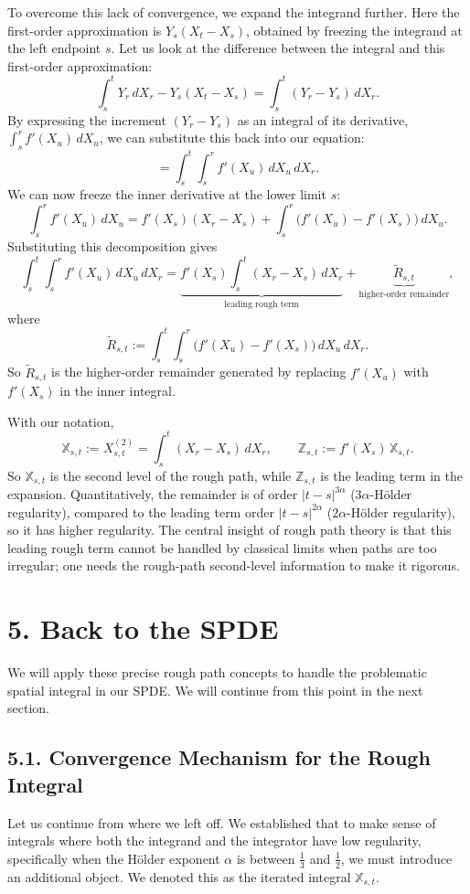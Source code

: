 \documentclass[11pt]{article}
\theoremstyle{definition}
\theoremstyle{remark}
\begin{document}
To overcome this lack of convergence, we expand the integrand further. Here the first-order approximation is $Y_s(X_t-X_s)$, obtained by freezing the integrand at the left endpoint $s$. Let us look at the difference between the integral and this first-order approximation:
\[
\int_s^t Y_r\,dX_r-Y_s(X_t-X_s)=\int_s^t (Y_r-Y_s)\,dX_r.
\]
By expressing the increment $(Y_r-Y_s)$ as an integral of its derivative, $\int_s^r f'(X_u)\,dX_u$, we can substitute this back into our equation:
\[
=\int_s^t\int_s^r f'(X_u)\,dX_u\,dX_r.
\]
We can now freeze the inner derivative at the lower limit $s$:
\[
\int_s^r f'(X_u)\,dX_u
=
f'(X_s)(X_r-X_s)+\int_s^r\bigl(f'(X_u)-f'(X_s)\bigr)\,dX_u.
\]
Substituting this decomposition gives
\[
\int_s^t\int_s^r f'(X_u)\,dX_u\,dX_r
=
\underbrace{f'(X_s)\int_s^t (X_r-X_s)\,dX_r}_{\text{leading rough term}}
+\underbrace{\widetilde R_{s,t}}_{\text{higher-order remainder}},
\]
where
\[
\widetilde R_{s,t}
:=
\int_s^t\int_s^r\bigl(f'(X_u)-f'(X_s)\bigr)\,dX_u\,dX_r.
\]
So $\widetilde R_{s,t}$ is the higher-order remainder generated by replacing $f'(X_u)$ with $f'(X_s)$ in the inner integral.

With our notation,
\[
\mathbb{X}_{s,t}:=X_{s,t}^{(2)}=\int_s^t (X_r-X_s)\,dX_r,
\qquad
\mathbb{Z}_{s,t}:=f'(X_s)\,\mathbb{X}_{s,t}.
\]
So $\mathbb{X}_{s,t}$ is the second level of the rough path, while $\mathbb{Z}_{s,t}$ is the leading term in the expansion.
Quantitatively, the remainder is of order $|t-s|^{3\alpha}$ ($3\alpha$-H\"older regularity), compared to the leading term order $|t-s|^{2\alpha}$ ($2\alpha$-H\"older regularity), so it has higher regularity.
The central insight of rough path theory is that this leading rough term cannot be handled by classical limits when paths are too irregular; one needs the rough-path second-level information to make it rigorous.

\section*{5. Back to the SPDE}
We will apply these precise rough path concepts to handle the problematic spatial integral in our SPDE. We will continue from this point in the next section.

\subsection*{5.1. Convergence Mechanism for the Rough Integral}
Let us continue from where we left off. We established that to make sense of integrals where both the integrand and the integrator have low regularity, specifically when the H\"older exponent $\alpha$ is between $\frac13$ and $\frac12$, we must introduce an additional object. We denoted this as the iterated integral $\mathbb{X}_{s,t}$.
\end{document}

